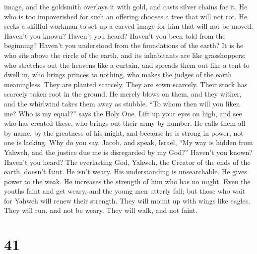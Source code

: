 image, and the goldsmith overlays it with gold, and casts silver chains
for it.  He who is too impoverished for such an offering
chooses a tree that will not rot. He seeks a skillful workman to set up
a carved image for him that will not be moved.  Haven't
you known? Haven't you heard? Haven't you been told from the beginning?
Haven't you understood from the foundations of the earth?
 It is he who sits above the circle of the earth, and its
inhabitants are like grasshoppers; who stretches out the heavens like a
curtain, and spreads them out like a tent to dwell in, 
who brings princes to nothing, who makes the judges of the earth
meaningless.  They are planted scarcely. They are sown
scarcely. Their stock has scarcely taken root in the ground. He merely
blows on them, and they wither, and the whirlwind takes them away as
stubble.  ``To whom then will you liken me? Who is my
equal?'' says the Holy One.  Lift up your eyes on high,
and see who has created these, who brings out their army by number. He
calls them all by name. by the greatness of his might, and because he is
strong in power, not one is lacking.  Why do you say,
Jacob, and speak, Israel, ``My way is hidden from Yahweh, and the
justice due me is disregarded by my God?''  Haven't you
known? Haven't you heard? The everlasting God, Yahweh, the Creator of
the ends of the earth, doesn't faint. He isn't weary. His understanding
is unsearchable.  He gives power to the weak. He
increases the strength of him who has no might.  Even the
youths faint and get weary, and the young men utterly fall;
 but those who wait for Yahweh will renew their strength.
They will mount up with wings like eagles. They will run, and not be
weary. They will walk, and not faint.

\hypertarget{section-40}{%
\section{41}\label{section-40}}

